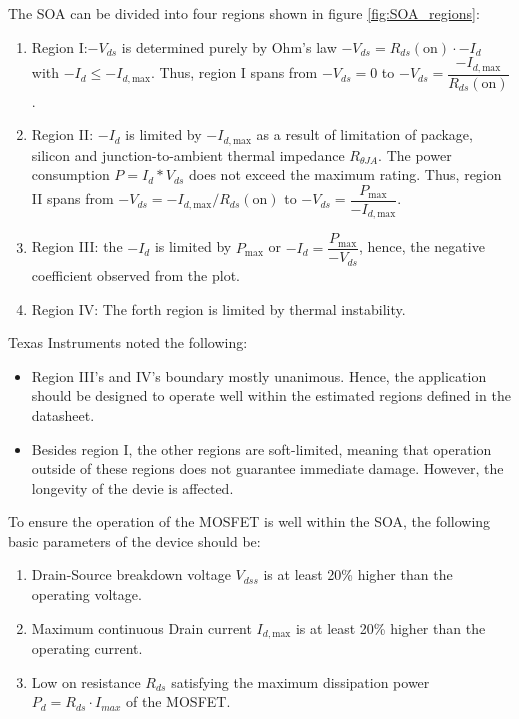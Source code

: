 \documentclass[main.tex]{subfiles}
\begin{document}
    \justify
    The SOA can be divided into four regions shown in figure \ref{fig:SOA_regions}:
    \begin{enumerate}
        \item Region I:$-V_{ds}$ is determined purely by Ohm's law  $-V_{ds} = R_{ds}(\text{on})\cdot -I_d$ with $-I_d \leq -I_{d,\text{max}}$. Thus, region I spans from $-V_{ds} = 0$ to $-V_{ds} = \dfrac{-I_{d,\text{max}}}{R_{ds}(\text{on})}$.
        \item Region II: $-I_{d}$ is limited by $-I_{d,\text{max}}$ as a result of limitation of package, silicon and junction-to-ambient thermal impedance $R_{\theta J A}$. The power consumption $P=I_{d} * V_{ds}$ does not exceed the maximum rating. Thus, region II spans from $-V_{ds} = -I_{d,\text{max}} / R_{ds}(\text{on})$ to $-V_{ds} = \dfrac{P_\text{max}}{-I_{d,\text{max}}}$.
        \item Region III: the $-I_{d}$ is limited by $P_\text{max}$ or $-I_d = \dfrac{P_\text{max}}{-V_{ds}}$, hence, the negative coefficient observed from the plot.
        \item Region IV: The forth region is limited by thermal instability. 
    \end{enumerate}

    \justify
    Texas Instruments \cite{TISOA} noted the following:
    \begin{itemize}
        \item Region III's and IV's boundary mostly unanimous. Hence, the application should be designed to operate well within the estimated regions defined in the datasheet. 
        \item Besides region I, the other regions are soft-limited, meaning that operation outside of these regions does not guarantee immediate damage. However, the longevity of the devie is affected.
    \end{itemize}

    \justify
    To ensure the operation of the MOSFET is well within the SOA, the following basic parameters of the device should be:

    \begin{enumerate}
        \item Drain-Source breakdown voltage $V_{dss}$ is at least 20\% higher than the operating voltage. 
        \item Maximum continuous Drain current $I_{d,\text{max}}$ is at least 20\% higher than the operating current.
        \item Low on resistance $R_{ds}$ satisfying the maximum dissipation power $P_{d}=R_{ds} \cdot I_{max}$ of the MOSFET.
    \end{enumerate}
\end{document}
